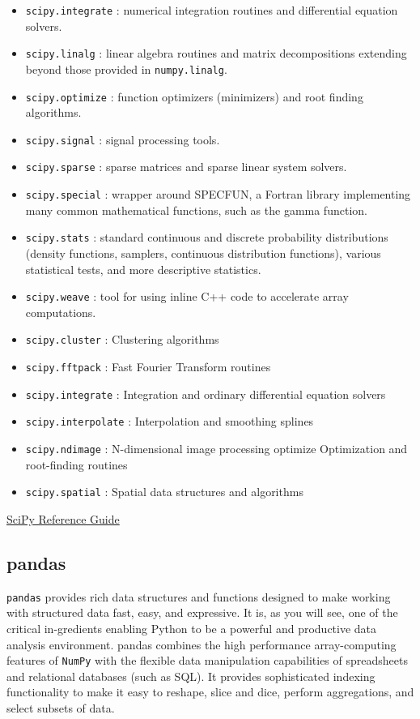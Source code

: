 \documentclass{article}
\begin{document}
\begin{itemize}
\item
  \texttt{scipy.integrate} : numerical integration routines and
  differential equation solvers.
\item
  \texttt{scipy.linalg} : linear algebra routines and matrix
  decompositions extending beyond those provided in
  \texttt{numpy.linalg}.
\item
  \texttt{scipy.optimize} : function optimizers (minimizers) and root
  finding algorithms.
\item
  \texttt{scipy.signal} : signal processing tools.
\item
  \texttt{scipy.sparse} : sparse matrices and sparse linear system
  solvers.
\item
  \texttt{scipy.special} : wrapper around SPECFUN, a Fortran library
  implementing many common mathematical functions, such as the gamma
  function.
\item
  \texttt{scipy.stats} : standard continuous and discrete probability
  distributions (density functions, samplers, continuous distribution
  functions), various statistical tests, and more descriptive
  statistics.
\item
  \texttt{scipy.weave} : tool for using inline C++ code to accelerate
  array computations.
\item
  \texttt{scipy.cluster} : Clustering algorithms
\item
  \texttt{scipy.fftpack} : Fast Fourier Transform routines
\item
  \texttt{scipy.integrate} : Integration and ordinary differential
  equation solvers
\item
  \texttt{scipy.interpolate} : Interpolation and smoothing splines
\item
  \texttt{scipy.ndimage} : N-dimensional image processing optimize
  Optimization and root-finding routines
\item
  \texttt{scipy.spatial} : Spatial data structures and algorithms
\end{itemize}

\href{http://docs.scipy.org/doc/scipy/reference/}{SciPy Reference Guide}

\subsection{pandas}\label{pandas}

\texttt{pandas} provides rich data structures and functions designed to
make working with structured data fast, easy, and expressive. It is, as
you will see, one of the critical in-gredients enabling Python to be a
powerful and productive data analysis environment. pandas combines the
high performance array-computing features of \texttt{NumPy} with the
flexible data manipulation capabilities of spreadsheets and relational
databases (such as SQL). It provides sophisticated indexing
functionality to make it easy to reshape, slice and dice, perform
aggregations, and select subsets of data.
\end{document}
